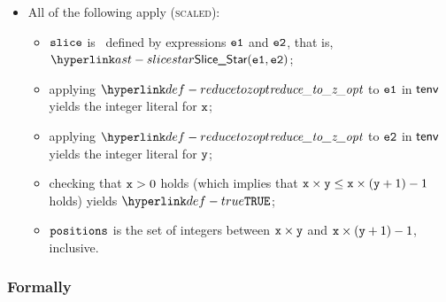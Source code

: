 \begin{itemize}
  \item All of the following apply (\textsc{scaled}):
  \begin{itemize}
    \item $\vslice$ is \scaledslice\ defined by expressions $\veone$ and $\vetwo$, that is, \\
          $\SliceStar(\veone, \vetwo)$;
    \item applying $\reducetozopt$ to $\veone$ in $\tenv$ yields the integer literal for $\vx$\ProseTerminateAs{\None};
    \item applying $\reducetozopt$ to $\vetwo$ in $\tenv$ yields the integer literal for $\vy$\ProseTerminateAs{\None};
    \item checking that $\vx > 0$ holds (which implies that $\vx \times \vy \leq \vx \times (\vy + 1) - 1$ holds) yields $\True$\ProseTerminateAs{\BadSlices};
    \item $\positions$ is the set of integers between $\vx \times \vy$ and $\vx \times (\vy + 1) - 1$, inclusive.
  \end{itemize}
\end{itemize}
\subsubsection{Formally}
\begin{mathpar}
\end{mathpar}

\begin{mathpar}
\end{mathpar}

